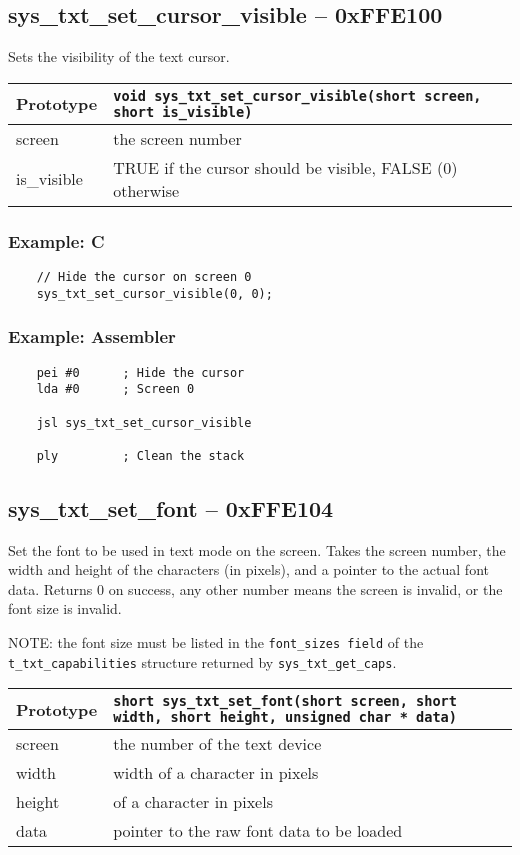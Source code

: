 \subsection*{sys\_txt\_set\_cursor\_visible -- 0xFFE100}
Sets the visibility of the text cursor.

\bigskip

\begin{tabular}{|l||l|} \hline
Prototype & \lstinline!void sys_txt_set_cursor_visible(short screen, short is_visible)! \\ \hline
screen & the screen number \\ \hline
is\_visible & TRUE if the cursor should be visible, FALSE (0) otherwise \\ \hline
\end{tabular}

\subsubsection*{Example: C}
\begin{lstlisting}
    // Hide the cursor on screen 0
    sys_txt_set_cursor_visible(0, 0);
\end{lstlisting}

\subsubsection*{Example: Assembler}
\begin{verbatim}
    pei #0      ; Hide the cursor
    lda #0      ; Screen 0

    jsl sys_txt_set_cursor_visible

    ply         ; Clean the stack
\end{verbatim}


\subsection*{sys\_txt\_set\_font -- 0xFFE104}
Set the font to be used in text mode on the screen. Takes the screen number, the width and height of the characters (in pixels), and a pointer to the actual font data. Returns 0 on success, any other number means the screen is invalid, or the font size is invalid.

NOTE: the font size must be listed in the \verb+font_sizes field+ of the \verb+t_txt_capabilities+ structure returned by \verb+sys_txt_get_caps+.

\bigskip

\begin{tabular}{|l||l|} \hline
Prototype & \lstinline!short sys_txt_set_font(short screen, short width, short height, unsigned char * data)! \\ \hline
screen & the number of the text device \\ \hline
width & width of a character in pixels \\ \hline
height & of a character in pixels \\ \hline
data & pointer to the raw font data to be loaded \\ \hline
\end{tabular}


